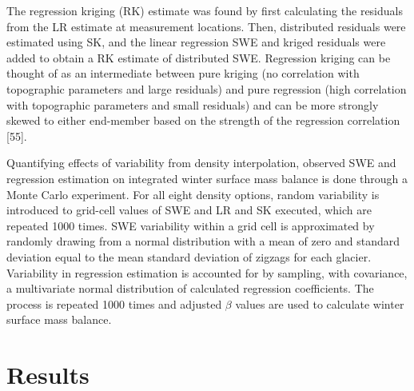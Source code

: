 \documentclass[twoside,twocolumn]{article}
\begin{document}
The regression kriging (RK) estimate was found by first calculating the residuals from the LR estimate at measurement locations. Then, distributed residuals were estimated using SK, and the linear regression SWE and kriged residuals were added to obtain a RK estimate of distributed SWE. Regression kriging can be thought of as an intermediate between pure kriging (no correlation with topographic parameters and large residuals) and pure regression (high correlation with topographic parameters and small residuals) and can be more strongly skewed to either end-member based on the strength of the regression correlation [55].

Quantifying effects of variability from density interpolation, observed SWE and regression estimation on integrated winter surface mass balance is done through a Monte Carlo experiment. For all eight density options, random variability is introduced to grid-cell values of SWE and LR and SK executed, which are repeated 1000 times. SWE variability within a grid cell is approximated by randomly drawing from a normal distribution with a mean of zero and standard deviation equal to the mean standard deviation of zigzags for each glacier. Variability in regression estimation is accounted for by sampling, with covariance, a multivariate normal distribution of calculated regression coefficients. The process is repeated 1000 times and adjusted $\beta$ values are used to calculate winter surface mass balance. 


\section{Results}








\end{document}
